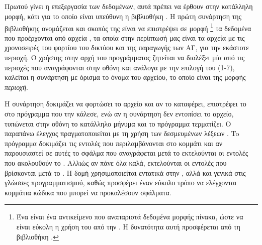 \documentclass[12pt]{report}
\begin{document}
\subsection{{}}
Πρωτού γίνει η επεξεργασία των δεδομένων, αυτά πρέπει να έρθουν στην κατάλληλη μορφή, κάτι για το οποίο είναι υπεύθυνη η βιβλιοθήκη {}. Η πρώτη συνάρτηση της βιβλιοθήκης ονομάζεται 
{\textbf{{}}} και σκοπός της είναι να επιστρέψει σε μορφή {}\footnote{Ένα {} είναι ένα αντικείμενο που αναπαριστά δεδομένα μορφής πίνακα, ώστε να είναι εύκολη η χρήση 
του από την {}. Η δυνατότητα αυτή προσφέρεται από τη βιβλιοθήκη {}.} τα δεδομένα που προέρχονται από αρχεία {}, τα οποία στην περίπτωσή μας είναι τα αρχεία με τις χρονοσειρές 
του φορτίου του δικτύου και της παραγωγής των ΑΓ, για την εκάστοτε περιοχή. Ο χρήστης στην αρχή του προγράμματος ζητείται να διαλέξει μία από τις περιοχές που αναγράφονται στην οθόνη και ανάλογα με την επιλογή του (1-7), καλείται η 
συνάρτηση με όρισμα το όνομα του αρχείου, το οποίο είναι της μορφής \textit{περιοχή}{}.

{}

Η συνάρτηση δοκιμάζει να φορτώσει το αρχείο και αν το καταφέρει, επιστρέφει το {} στο πρόγραμμα που την κάλεσε, ενώ αν η συνάρτηση δεν εντοπίσει το αρχείο, τυπώνεται στην οθόνη το κατάλληλο μήνυμα και το πρόγραμμα
τερματίζει. Ο παραπάνω έλεγχος πραγματοποιείται με τη χρήση των δεσμευμένων λέξεων {}. To πρόγραμμα δοκιμάζει τις εντολές που περιλαμβάνονται στο κομμάτι {} και αν παρουσιαστεί σε αυτές
το σφάλμα που αναγράφεται μετά το {} εκτελούνται οι εντολές που ακολουθούν το {}. Αλλιώς αν πάνε όλα καλά, εκτελούνται οι εντολές που βρίσκονται μετά το {}. Η δομή 
{} χρησιμοποιείται εντατικά στην {}, αλλά και γενικά στις γλώσσες προγραμματισμού, καθώς προσφέρει έναν εύκολο τρόπο να ελέγχονται κομμάτια κώδικα που μπορεί να προκαλέσουν σφάλματα.
\end{document}

